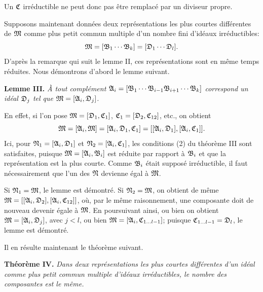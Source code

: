 Un $\mathfrak{C}$ irréductible ne peut donc pas être remplacé par un diviseur propre.

Supposons maintenant données deux représentations les plus courtes différentes de $\mathfrak{M}$ comme plus petit commun multiple d'un nombre fini d'idéaux irréductibles:
\[
 \mathfrak{M}=[\mathfrak{B}_1\cdots\mathfrak{B}_k]=[\mathfrak{D}_1\cdots\mathfrak{D}_l].
\]
D'après la remarque qui suit le lemme II, ces représentations sont en même temps réduites. Nous démontrons d'abord le lemme suivant.

\textbf{Lemme III.} \emph{À tout complément $\mathfrak{A}_i=[\mathfrak{B}_1\cdots\mathfrak{B}_{i-1}\mathfrak{B}_{i+1}\cdots\mathfrak{B}_k]$ correspond un idéal $\mathfrak{D}_j$ tel que $\mathfrak{M}=[\mathfrak{A}_i,\mathfrak{D}_j]$.}

En effet, si l'on pose $\mathfrak{M}=[\mathfrak{D}_1,\mathfrak{C}_1]$, $\mathfrak{C}_1=[\mathfrak{D}_2,\mathfrak{C}_{12}]$, etc., on obtient
\[
 \mathfrak{M}=[\mathfrak{A}_i,\mathfrak{M}]=[\mathfrak{A}_i,\mathfrak{D}_1,\mathfrak{C}_1]
       =[[\mathfrak{A}_i,\mathfrak{D}_1],[\mathfrak{A}_i,\mathfrak{C}_1]].
\]
Ici, pour $\mathfrak{N}_1=[\mathfrak{A}_i,\mathfrak{D}_1]$ et $\mathfrak{N}_2=[\mathfrak{A}_i,\mathfrak{C}_1]$, les conditions (2) du théorème III sont satisfaites, puisque $\mathfrak{M}=[\mathfrak{A}_i,\mathfrak{B}_i]$ est réduite par rapport à $\mathfrak{B}_i$ et que la représentation est la plus courte. Comme $\mathfrak{B}_i$ était supposé irréductible, il faut nécessairement que l'un des $\mathfrak{N}$ devienne égal à $\mathfrak{M}$.

Si $\mathfrak{N}_1=\mathfrak{M}$, le lemme est démontré. Si $\mathfrak{N}_2=\mathfrak{M}$, on obtient de même $\mathfrak{M}=[[\mathfrak{A}_i,\mathfrak{D}_2],[\mathfrak{A}_i,\mathfrak{C}_{12}]]$, où, par le même raisonnement, une composante doit de nouveau devenir égale à $\mathfrak{M}$. En poursuivant ainsi, ou bien on obtient $\mathfrak{M}=[\mathfrak{A}_i,\mathfrak{D}_j]$, avec $j<l$, ou bien $\mathfrak{M}=[\mathfrak{A}_i,\mathfrak{C}_{1\ldots l-1}]$; puisque $\mathfrak{C}_{1\ldots l-1}=\mathfrak{D}_l$, le lemme est démontré.

Il en résulte maintenant le théorème suivant.

\textbf{Théorème IV.} \emph{Dans deux représentations les plus courtes différentes d'un idéal comme plus petit commun multiple d'idéaux irréductibles, le nombre des composantes est le même.}

